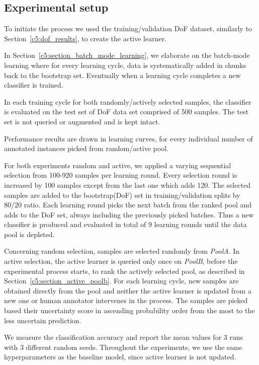 \subsection{Experimental setup}

To initiate the process we used the training/validation DoF dataset, similarly to Section~\ref{c5:dof_results}, to create the active learner.

In Section~\ref{c5:section_batch_mode_learning}, we elaborate on the batch-mode learning where for every learning cycle, data is systematically added in chunks back to the bootstrap set. Eventually when a learning cycle completes a new classifier is trained.

In each training cycle for both randomly/actively selected samples, the classifier is evaluated on the test set of DoF data set comprised of 500 samples. The test set is not queried or augmented and is kept intact.
 
Performance results are drawn in learning curves, for every individual number of annotated instances picked from random/active pool.

For both experiments random and active, we applied a varying sequential selection from 100-920 samples per learning round. Every selection round is increased by 100 samples except from the last one which adds 120. The selected samples are added to the bootstrap(DoF) set in training/validation splits by 80/20 ratio.
Each learning round picks the next batch from the ranked pool and adds to the DoF set, always including the previously picked batches. Thus a new classifier is produced and evaluated in total of 9 learning rounds until the data pool is depleted.

Concerning random selection, samples are selected randomly from \textit{PoolA}.
In active selection, the active learner is queried only once on \textit{PoolB}, before the experimental process starts, to rank the actively selected pool, as described in Section~\ref{c5:section_active_poolb}.
For each learning cycle, new samples are obtained directly from the pool and neither the active learner is updated from a new one or human annotator intervenes in the process.
The samples are picked based their uncertainty score in ascending probability order from the most to the less uncertain prediction.

We measure the classification accuracy and report the mean values for 3 runs with 3 different random seeds. Throughout the experiments, we use the same hyperparameters as the baseline model, since active learner is not updated.

